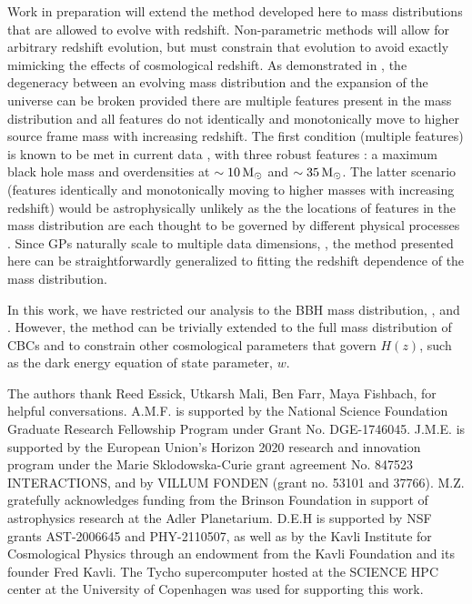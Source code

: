 \documentclass[]{aastex631}
\begin{document}
Work in preparation will extend the method developed here to mass distributions that are allowed to evolve with redshift.
Non-parametric methods will allow for arbitrary redshift evolution, but must constrain that evolution to avoid exactly mimicking the effects of cosmological redshift.
As demonstrated in \citet{ezquiaga_spectral_2022}, the degeneracy between an evolving mass distribution and the expansion of the universe can be broken provided there are multiple features present in the mass distribution and all features do not identically and monotonically move to higher source frame mass with increasing redshift.
The first condition (multiple features) is known to be met in current data \citep{abbott_population_2023}, with three robust features \citep{farah_things_2023}: a maximum black hole mass and overdensities at $\sim10\,\text{M}_{\odot}$ and $\sim35\,\text{M}_{\odot}$.
The latter scenario (features identically and monotonically moving to higher masses with increasing redshift) would be astrophysically unlikely as the the locations of features in the mass distribution are each thought to be governed by different physical processes \citep[e.g.][]{mapelli_binary_2020}.
Since \aclp{GP} naturally scale to multiple data dimensions, \citep{rasmussen_gaussian_2006}, the method presented here can be straightforwardly generalized to fitting the redshift dependence of the mass distribution. 

In this work, we have restricted our analysis to the \ac{BBH} mass distribution, \Ho, and \Omm.
However, the method can be trivially extended to the full mass distribution of \acp{CBC} \citep[e.g.][]{fishbach_does_2020, ezquiaga_spectral_2022} and to constrain other cosmological parameters that govern $H(z)$, such as the dark energy equation of state parameter, $w$. 

\begin{acknowledgments}
    The authors thank Reed Essick, Utkarsh Mali, Ben Farr, Maya Fishbach,  for helpful conversations. 
    A.M.F. is supported by the National Science Foundation Graduate Research Fellowship Program under Grant No. DGE-1746045.
    J.M.E. is supported by the European Union’s Horizon 2020 research and innovation program under the Marie Sklodowska-Curie grant agreement No. 847523 INTERACTIONS, and by VILLUM FONDEN (grant no. 53101 and 37766). 
    M.Z. gratefully acknowledges funding from the Brinson Foundation in support of astrophysics research at the Adler Planetarium.
    D.E.H is supported by NSF grants AST-2006645 and PHY-2110507, as well as by the Kavli Institute for Cosmological Physics through an endowment from the Kavli Foundation and its founder Fred Kavli.
    The Tycho supercomputer hosted at the SCIENCE HPC center at the University of Copenhagen was used for supporting this work.
\end{acknowledgments}
\end{document}
